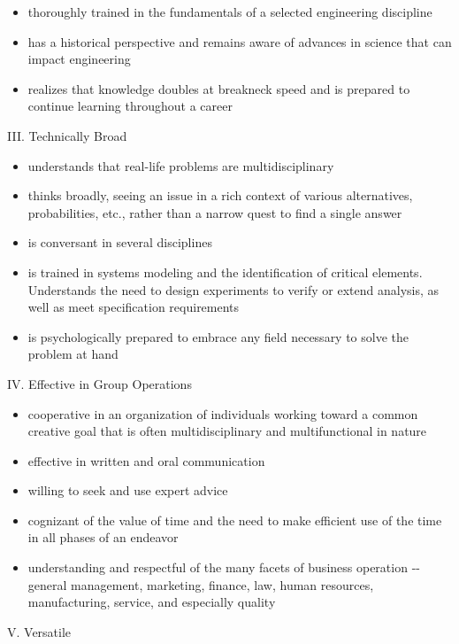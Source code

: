 \begin{itemize}
\item
  thoroughly trained in the fundamentals of a selected engineering
  discipline
\item
  has a historical perspective and remains aware of advances in science
  that can impact engineering
\item
  realizes that knowledge doubles at breakneck speed and is prepared to
  continue learning throughout a career
\end{itemize}

III. Technically Broad

\begin{itemize}
\item
  understands that real-life problems are multidisciplinary
\item
  thinks broadly, seeing an issue in a rich context of various
  alternatives, probabilities, etc., rather than a narrow quest to find
  a single answer
\item
  is conversant in several disciplines
\item
  is trained in systems modeling and the identification of critical
  elements. Understands the need to design experiments to verify or
  extend analysis, as well as meet specification requirements
\item
  is psychologically prepared to embrace any field necessary to solve
  the problem at hand
\end{itemize}

IV. Effective in Group Operations

\begin{itemize}
\item
  cooperative in an organization of individuals working toward a common
  creative goal that is often multidisciplinary and multifunctional in
  nature
\item
  effective in written and oral communication
\item
  willing to seek and use expert advice
\item
  cognizant of the value of time and the need to make efficient use of
  the time in all phases of an endeavor
\item
  understanding and respectful of the many facets of business operation
  -\/- general management, marketing, finance, law, human resources,
  manufacturing, service, and especially quality
\end{itemize}

V. Versatile

